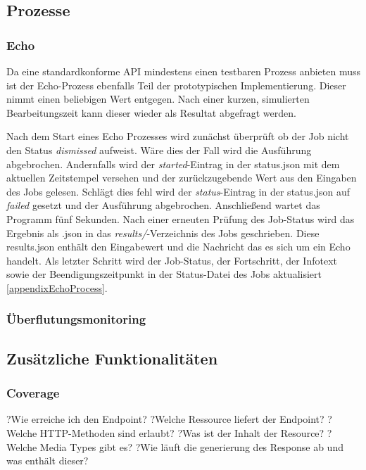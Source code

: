 \subsection{Prozesse}
\subsubsection{Echo}
Da eine standardkonforme API mindestens einen testbaren Prozess anbieten muss ist der Echo-Prozess ebenfalls Teil der prototypischen Implementierung. 
Dieser nimmt einen beliebigen Wert entgegen. Nach einer kurzen, simulierten Bearbeitungszeit kann dieser wieder als Resultat abgefragt werden. 

Nach dem Start eines Echo Prozesses wird zunächst überprüft ob der Job nicht den Status \textit{dismissed} aufweist. Wäre dies der Fall wird die Ausführung abgebrochen. 
Andernfalls wird der \textit{started}-Eintrag in der status.json mit dem aktuellen Zeitstempel versehen und der zurückzugebende Wert aus den Eingaben des Jobs gelesen.
Schlägt dies fehl wird der \textit{status}-Eintrag in der status.json auf \textit{failed} gesetzt und der Ausführung abgebrochen. 
Anschließend wartet das Programm fünf Sekunden. Nach einer erneuten Prüfung des Job-Status wird das Ergebnis als .json in das \textit{results/}-Verzeichnis des Jobs geschrieben.
Diese results.json enthält den Eingabewert und die Nachricht das es sich um ein Echo handelt. 
Als letzter Schritt wird der Job-Status, der Fortschritt, der Infotext sowie der Beendigungszeitpunkt in der Status-Datei des Jobs aktualisiert \ref{appendixEchoProcess}. 
\subsubsection{Überflutungsmonitoring}
\subsection{Zusätzliche Funktionalitäten}
\subsubsection{Coverage} 
?Wie erreiche ich den Endpoint?
?Welche Ressource liefert der Endpoint?
?Welche HTTP-Methoden sind erlaubt?
?Was ist der Inhalt der Resource?
?Welche Media Types gibt es?
?Wie läuft die generierung des Response ab und was enthält dieser?